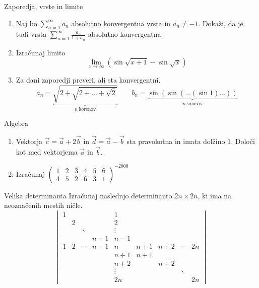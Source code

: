 \begin{frame}{Zaporedja, vrste in limite}
	\begin{enumerate}
		\item 
		Naj bo $\sum_{n=1}^\infty a_n$ absolutno konvergentna vrsta in $a_n \ne -1$.
		Dokaži, da je tudi vrsta $\sum_{n=1}^\infty \frac{a_n}{1+a_n}$
		absolutno konvergentna.

		\item
		Izračunaj limito
		$$
		\lim_{x \to \infty} (\sin\sqrt{x+1}-\sin\sqrt{x})
		$$
		
		\item
		Za dani zaporedji preveri, ali sta konvergentni.
		$$
		a_n = \underbrace{\sqrt{2+\sqrt{2+\dots+\sqrt{2}}}}_{n~\text{korenov}} \qquad
		b_n = \underbrace{\sin(\sin(\dots(\sin 1)\dots))}_{n~\text{sinusov}}
		$$

	\end{enumerate}
\end{frame}

\begin{frame}{Algebra}
	\begin{enumerate}
		\item
		Vektorja $\vec{c} = \vec{a} + 2\vec{b}$ in $\vec{d} = \vec{a} - \vec{b}$
		sta pravokotna in imata dolžino 1. Določi kot med vektorjema $\vec{a}$ in $\vec{b}$.
		\item 
		Izračunaj
		$ \displaystyle{\begin{pmatrix}1&2&3&4&5&6\\4&5&2&6&3&1\end{pmatrix}^{-2000}} $
	\end{enumerate}
\end{frame}

\begin{frame}{Velika determinanta}
	Izračunaj naslednjo determinanto $2n \times 2n$, ki ima na neoznačenih mestih ničle.
	$$
	\begin{vmatrix}
		1 &&&& 1 &&&& \\
		& 2 &&& 2 &&&& \\
		&& \ddots  && \vdots &&&& \\
		&&& n-1 & n-1 &&&& \\
		1 & 2 & \cdots & n-1 & n & n+1 & n+2 & \cdots & 2n \\
		&&&& n+1 & n+1 &&& \\
		&&&& n+2 && n+2 && \\
		&&&& \vdots &&& \ddots & \\
		&&&& 2n &&&& 2n
	\end{vmatrix}
	$$
\end{frame}

